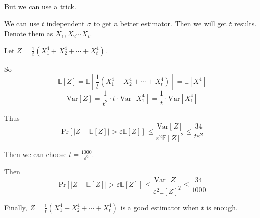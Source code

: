 			But we can use a trick.
			
			We can use $t$ independent $\sigma$ to get a better estimator.
			Then we will get $t$ results.
			Denote them as $X_1, X_2 \cdots X_t$.
			
			Let $Z = \frac{1}{t} (X_1^4 + X_2^4 + \cdots + X_t^4)$.
			
			So
			\[
				\mathbb{E}[Z] = \mathbb{E}[\frac{1}{t} (X_1^4 + X_2^4 + \cdots + X_t^4)] = \mathbb{E}[X^4]
			\]
			\[
				\text{Var}[Z] = \frac{1}{t^2} \cdot t \cdot \text{Var}[X_1^4] = \frac{1}{t} \cdot \text{Var}[X_1^4]
			\]
			
			Thus
			\[
				\text{Pr}[|Z - \mathbb{E}[Z]| > \varepsilon \mathbb{E}[Z]] \leq \frac{\text{Var}[Z]}{\varepsilon^2 \mathbb{E}[Z]^2} \leq \frac{34}{t\varepsilon^2}
			\]
			
			Then we can choose $t = \frac{1000}{\varepsilon^2}$.
			
			Then
			\[
				\text{Pr}[|Z - \mathbb{E}[Z]| > \varepsilon \mathbb{E}[Z]] \leq \frac{\text{Var}[Z]}{\varepsilon^2 \mathbb{E}[Z]^2} \leq \frac{34}{1000}
			\]
			
			Finally, $Z = \frac{1}{t} (X_1^4 + X_2^4 + \cdots + X_t^4)$ is a good estimator when $t$ is enough.
